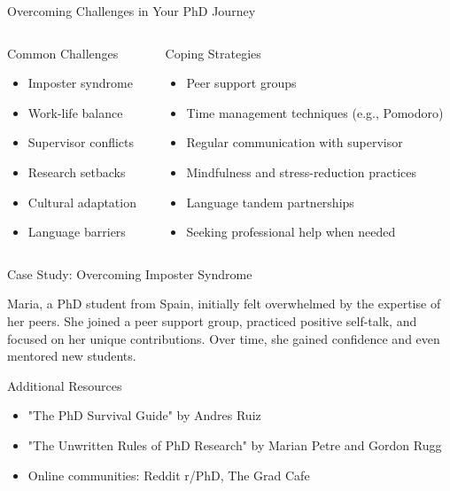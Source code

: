 \documentclass[aspectratio=169,10pt]{beamer}
\begin{document}
\begin{frame}{Overcoming Challenges in Your PhD Journey}
\begin{columns}[T]
    \begin{column}{0.5\textwidth}
        \alert{Common Challenges}
        \begin{itemize}
            \item Imposter syndrome
            \item Work-life balance
            \item Supervisor conflicts
            \item Research setbacks
            \item Cultural adaptation
            \item Language barriers
        \end{itemize}
    \end{column}
    \begin{column}{0.5\textwidth}
        \alert{Coping Strategies}
        \begin{itemize}
            \item Peer support groups
            \item Time management techniques (e.g., Pomodoro)
            \item Regular communication with supervisor
            \item Mindfulness and stress-reduction practices
            \item Language tandem partnerships
            \item Seeking professional help when needed
        \end{itemize}
    \end{column}
\end{columns}

\vspace{0.3cm}
\alert{Case Study: Overcoming Imposter Syndrome}
\begin{tcolorbox}[colback=green!5,colframe=green!40!black]
Maria, a PhD student from Spain, initially felt overwhelmed by the expertise of her peers. She joined a peer support group, practiced positive self-talk, and focused on her unique contributions. Over time, she gained confidence and even mentored new students.
\end{tcolorbox}

\alert{Additional Resources}
\begin{itemize}
    \item "The PhD Survival Guide" by Andres Ruiz
    \item "The Unwritten Rules of PhD Research" by Marian Petre and Gordon Rugg
    \item Online communities: Reddit r/PhD, The Grad Cafe
\end{itemize}
\end{frame}
\end{document}
